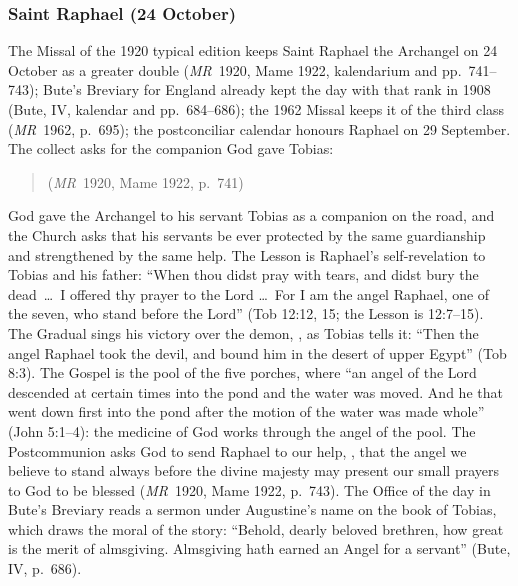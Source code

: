 \subsubsection{Saint Raphael (24 October)}

The Missal of the 1920 typical edition keeps Saint Raphael the Archangel
on 24 October as a greater double (\emph{MR}~1920, Mame 1922, kalendarium
and pp.~741--743); Bute's Breviary for England already kept the day with
that rank in 1908 (Bute, IV, kalendar and pp.~684--686); the 1962 Missal
keeps it of the third class (\emph{MR}~1962, p.~695); the postconciliar
calendar honours Raphael on 29 September. The collect asks for the
companion God gave Tobias:
\begin{quote}
 (\emph{MR}~1920, Mame 1922, p.~741)
\end{quote}
God gave the Archangel to his servant Tobias as a companion on the road,
and the Church asks that his servants be ever protected by the same
guardianship and strengthened by the same help. The Lesson is Raphael's
self-revelation to Tobias and his father: ``When thou didst pray with
tears, and didst bury the dead~\dots\ I offered thy prayer to the Lord
\dots\ For I am the angel Raphael, one of the seven, who stand before the
Lord'' (Tob 12:12, 15; the Lesson is 12:7--15). The Gradual sings his victory over the demon,
, as
Tobias tells it: ``Then the angel Raphael took the devil, and bound him in
the desert of upper Egypt'' (Tob 8:3). The Gospel is the pool of the five
porches, where ``an angel of the Lord descended at certain times into the
pond and the water was moved. And he that went down first into the pond
after the motion of the water was made whole'' (John 5:1--4): the
medicine of God works through the angel of the pool. The Postcommunion
asks God to send Raphael to our help, , that the angel we believe to stand always before the divine
majesty may present our small prayers to God to be blessed (\emph{MR}~1920,
Mame 1922, p.~743). The Office of the day in Bute's Breviary reads a
sermon under Augustine's name on the book of Tobias, which draws the
moral of the story: ``Behold, dearly beloved brethren, how great is the
merit of almsgiving. Almsgiving hath earned an Angel for a servant''
(Bute, IV, p.~686).

